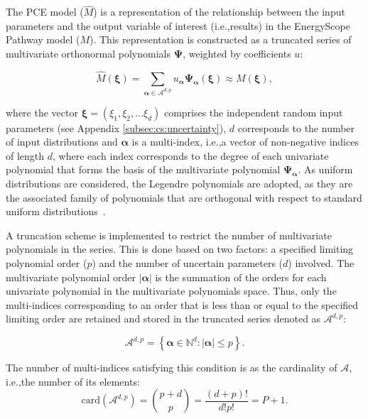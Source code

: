 \documentclass[11pt,twoside,a4paper,english]{article}
\def\ie{i.e.,}
\begin{document}
\begin{appendices}
The PCE model ($\hat{M}$) is a representation of the relationship between the input parameters and the output variable of interest (\ie results) in the EnergyScope Pathway model ($M$). This representation is constructed as a truncated series of multivariate orthonormal polynomials $\bm{\Psi}$, weighted by coefficients $u$:

\begin{equation}
\hat{M} \left( \bm{\xi} \right) = \sum_{\bm{\alpha} \in \mathcal{A}^{d,p}} u_{\bm{\alpha}} \bm{\Psi}_{\bm{\alpha}} \left( \bm{\xi} \right) \approx M \left( \bm{\xi} \right), 
\end{equation}

where the vector $\bm{\xi} = (\xi_1,\xi_2, \dots \xi_d)$ comprises the independent random input parameters (see Appendix \ref{subsec:cs:uncertainty}), $d$ corresponds to the number of input distributions and $\bm{\alpha}$ is a multi-index, \ie a vector of non-negative indices of length $d$, where each index corresponds to the degree of each univariate polynomial that forms the basis of the multivariate polynomial $\bm{\Psi_{\bm{\alpha}}}$. As uniform distributions are considered, the Legendre polynomials are adopted, as they are the associated family of polynomials that are orthogonal with respect to standard uniform distributions~\cite{Sudret2014}.\par 

A truncation scheme is implemented to restrict the number of multivariate polynomials in the series. This is done based on two factors: a specified limiting polynomial order ($p$) and the number of uncertain parameters ($d$) involved. The multivariate polynomial order $|\bm{\alpha}|$ is the summation of the orders for each univariate polynomial in the multivariate polynomials space. Thus, only the multi-indices corresponding to an order that is less than or equal to the specified limiting order are retained and stored in the truncated series denoted as $\mathcal{A}^{d,p}$:

\begin{equation}
\mathcal{A}^{d,p} = \left \{ \bm{\alpha} \in \mathbb{N}^d : |\bm{\alpha}| \leq p \right \}. 
\end{equation}

The number of multi-indices satisfying this condition is as the cardinality of $\mathcal{A}$, \ie the number of its elements:
\begin{equation}
\mathrm{card} \left( \mathcal{A}^{d,p} \right) = {p + d \choose p} = \dfrac{\left( d + p \right) !}{d! p!} = P + 1.
\label{eq:pce:nterms}
\end{equation}


\end{appendices}
\end{document}
